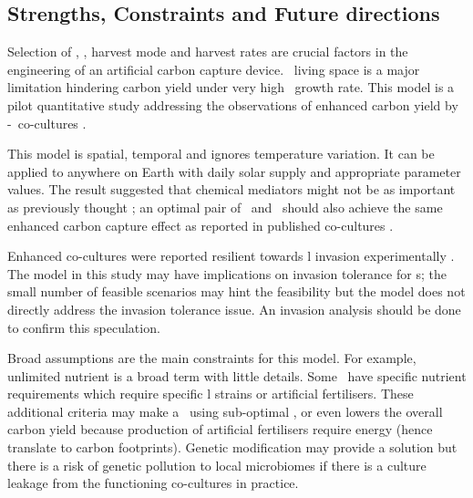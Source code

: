 \documentclass[../thesis.tex]{subfiles} %
\begin{document}
\subsection{Strengths, Constraints and Future directions}
Selection of \phy, \bac, harvest mode and harvest rates are crucial factors in the engineering of an artificial carbon capture device.  \Phy\ living space is a major limitation hindering carbon yield under very high \phy\ growth rate.  This model is a pilot quantitative study addressing the observations of enhanced carbon yield by \phy-\bac\ co-cultures \autocite{fuentes2016impact,santos2014microalgal}.

This model is spatial, temporal and ignores temperature variation.  It can be applied to anywhere on Earth with daily solar supply and appropriate parameter values.  The result suggested that chemical mediators might not be as important as previously thought \autocite{fuentes2016impact}; an optimal pair of \phy\ and \bac\ should also achieve the same enhanced carbon capture effect as reported in published co-cultures \autocite{amin2009photolysis,rivas2010interactions,seyedsayamdost2011roseobacticides}.

Enhanced co-cultures were reported resilient towards \bac l invasion experimentally \autocite{fuentes2016impact,seyedsayamdost2011roseobacticides}.  The model in this study may have implications on invasion tolerance for \pbs s; the small number of feasible scenarios may hint the feasibility but the model does not directly address the invasion tolerance issue.  An invasion analysis should be done to confirm this speculation.

Broad assumptions are the main constraints for this model.  For example, unlimited nutrient is a broad term with little details.  Some \phy\ have specific nutrient requirements \autocite{kazamia2012mutualistic} which require specific \bac l strains or artificial fertilisers.  These additional criteria may make a \pbs\ using sub-optimal \bac, or even lowers the overall carbon yield because production of artificial fertilisers require energy (hence translate to carbon footprints).  Genetic modification may provide a solution but there is a risk of genetic pollution to local microbiomes if there is a culture leakage from the functioning co-cultures in practice.
\end{document}
